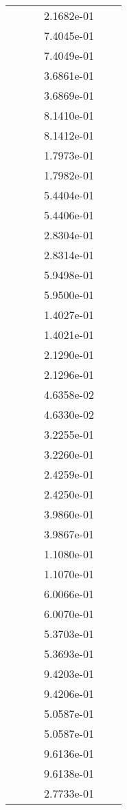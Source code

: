 \begin{xltabular}{\textwidth}{r|rS[table-format=1.3e+2]S[table-format=1.4e+2]S[table-format=1.4e+2]S[table-format=-1.5]}
&  &  & 2.1682e-01 & & \\
&  &  & 7.4045e-01 & & \\
&  &  & 7.4049e-01 & & \\
&  &  & 3.6861e-01 & & \\
&  &  & 3.6869e-01 & & \\
&  &  & 8.1410e-01 & & \\
&  &  & 8.1412e-01 & & \\
&  &  & 1.7973e-01 & & \\
&  &  & 1.7982e-01 & & \\
&  &  & 5.4404e-01 & & \\
&  &  & 5.4406e-01 & & \\
&  &  & 2.8304e-01 & & \\
&  &  & 2.8314e-01 & & \\
&  &  & 5.9498e-01 & & \\
&  &  & 5.9500e-01 & & \\
&  &  & 1.4027e-01 & & \\
&  &  & 1.4021e-01 & & \\
&  &  & 2.1290e-01 & & \\
&  &  & 2.1296e-01 & & \\
&  &  & 4.6358e-02 & & \\
&  &  & 4.6330e-02 & & \\
&  &  & 3.2255e-01 & & \\
&  &  & 3.2260e-01 & & \\
&  &  & 2.4259e-01 & & \\
&  &  & 2.4250e-01 & & \\
&  &  & 3.9860e-01 & & \\
&  &  & 3.9867e-01 & & \\
&  &  & 1.1080e-01 & & \\
&  &  & 1.1070e-01 & & \\
&  &  & 6.0066e-01 & & \\
&  &  & 6.0070e-01 & & \\
&  &  & 5.3703e-01 & & \\
&  &  & 5.3693e-01 & & \\
&  &  & 9.4203e-01 & & \\
&  &  & 9.4206e-01 & & \\
&  &  & 5.0587e-01 & & \\
&  &  & 5.0587e-01 & & \\
&  &  & 9.6136e-01 & & \\
&  &  & 9.6138e-01 & & \\
&  &  & 2.7733e-01 & & \\

\end{xltabular}
